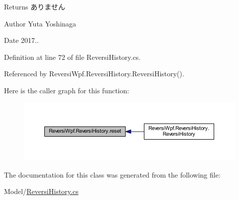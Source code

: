 \begin{DoxyReturn}{Returns}
ありません 
\end{DoxyReturn}
\begin{DoxyAuthor}{Author}
Yuta Yoshinaga 
\end{DoxyAuthor}
\begin{DoxyDate}{Date}
2017.. 
\end{DoxyDate}


Definition at line 72 of file Reversi\+History.\+cs.



Referenced by Reversi\+Wpf.\+Reversi\+History.\+Reversi\+History().

Here is the caller graph for this function\+:\nopagebreak
\begin{figure}[H]
\begin{center}
\leavevmode
\includegraphics[width=350pt]{class_reversi_wpf_1_1_reversi_history_a2a57686bf23df7dcfa8ee9cd8cdc7fdb_icgraph}
\end{center}
\end{figure}


The documentation for this class was generated from the following file\+:\begin{DoxyCompactItemize}
\item 
Model/\hyperlink{_reversi_history_8cs}{Reversi\+History.\+cs}\end{DoxyCompactItemize}
